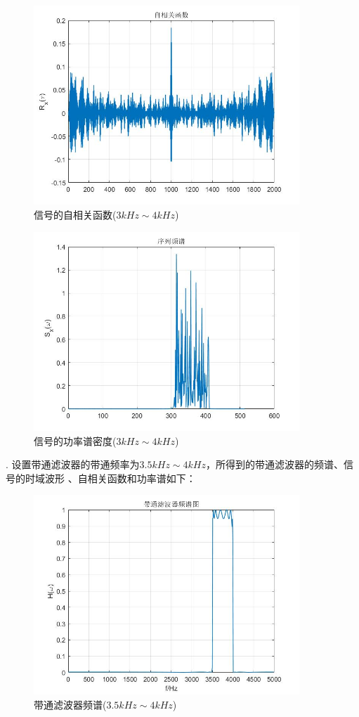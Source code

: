 \documentclass[UTF-8, a4paper, 12pt]{ctexart}
\begin{document}
\begin{figure}[htbp]
    \centering
    \includegraphics[width=10cm]{figs/f33.jpg}
    \caption{信号的自相关函数($3kHz\sim 4kHz$)}
\end{figure}
\begin{figure}[htbp]
    \centering
    \includegraphics[width=10cm]{figs/f34.jpg}
    \caption{信号的功率谱密度($3kHz\sim 4kHz$)}
\end{figure}
. 设置带通滤波器的带通频率为$3.5kHz\sim 4kHz$，所得到的带通滤波器的频谱、信号的时域波形
、自相关函数和功率谱如下：
\begin{figure}[htbp]
    \centering
    \includegraphics[width=10cm]{figs/f41.jpg}
    \caption{带通滤波器频谱($3.5kHz\sim 4kHz$)}
\end{figure}
\end{document}
